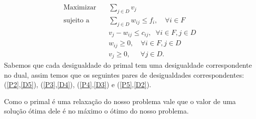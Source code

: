 \documentclass[12pt]{article}
\begin{document}
    \begin{align}
        \text{Maximizar} \quad & \sum_{j \in D} v_{j} \tag{D1} \label{D1}\\
        \text{sujeito a} \quad & \sum_{j\in D} w_{ij}\leq f_i, \quad \forall i \in F \tag{D2} \label{D2}\\
        &v_{j} - w_{ij}\leq c_{ij},  \; \; \forall i\in F,j\in D \tag{D3} \label{D3}\\
        &w_{ij} \geq 0 ,\quad \forall i\in F,j\in D\tag{D4} \label{D4}\\
        &v_j \geq 0, \quad \; \,\forall j\in D \tag{D5} \label{D5}.
       \end{align}
Sabemos que cada desigualdade do primal tem uma desigualdade correspondente no dual, assim temos que os seguintes pares de desigualdades correspondentes: (\ref{P2},\ref{D5}), (\ref{P3},\ref{D4}), (\ref{P4},\ref{D3}) e (\ref{P5},\ref{D2}).

Como o primal é uma relaxação do nosso problema vale que o valor de uma solução ótima dele é no máximo o ótimo do nosso problema.
\end{document}
